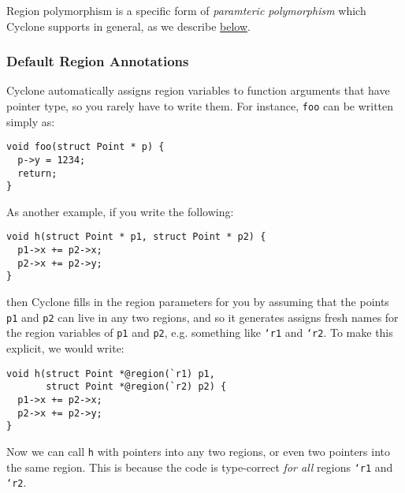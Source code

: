 Region polymorphism is a specific form of \emph{paramteric
polymorphism} which Cyclone supports in general, as we describe 
\hyperref[{sec:polyfun}]{below}.

\subsubsection*{Default Region Annotations}

Cyclone automatically assigns region variables to function
arguments that have pointer type, so you rarely have to write them.  For instance,
\texttt{foo} can be written simply as:
\begin{verbatim}
void foo(struct Point * p) {
  p->y = 1234;
  return;
}
\end{verbatim}
As another example, if you write the following:
\begin{verbatim}
void h(struct Point * p1, struct Point * p2) {
  p1->x += p2->x;
  p2->x += p2->y;
}
\end{verbatim}
then Cyclone fills in the region parameters for you by assuming that
the points \texttt{p1} and \texttt{p2} can live in any two regions,
and so it generates assigns fresh names for the region variables of
\texttt{p1} and \texttt{p2}, e.g. something like \texttt{`r1} and
\texttt{`r2}.  To make this explicit, we would write:
\begin{verbatim}
void h(struct Point *@region(`r1) p1, 
       struct Point *@region(`r2) p2) {
  p1->x += p2->x;
  p2->x += p2->y;
}
\end{verbatim}
Now we can call \texttt{h} with pointers into any two regions,
or even two pointers into the same region.  This is because
the code is type-correct \emph{for all} regions \texttt{`r1} and \texttt{`r2}.

